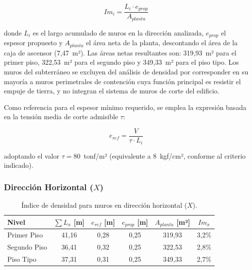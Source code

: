 \begin{equation}
    Im_i = \frac{L_i \cdot e_{prop}}{A_{planta}}
    \label{eq:densidad}
\end{equation}

donde $L_i$ es el largo acumulado de muros en la dirección analizada, 
$e_{prop}$ el espesor propuesto y $A_{planta}$ el área neta de la planta, 
descontando el área de la caja de ascensor (7{,}47~m²). Las áreas netas 
resultantes son: 319{,}93~m² para el primer piso, 322{,}53~m² para el 
segundo piso y 349{,}33~m² para el piso tipo. Los muros del subterráneo 
se excluyen del análisis de densidad por corresponder en su mayoría a 
muros perimetrales de contención cuya función principal es resistir el 
empuje de tierra, y no integran el sistema de muros de corte del edificio.

Como referencia para el espesor mínimo requerido, se emplea la expresión 
basada en la tensión media de corte admisible $\tau$:

\begin{equation}
    e_{ref} = \frac{V}{\tau \cdot L_i}
    \label{eq:eref}
\end{equation}

adoptando el valor $\tau = 80$~tonf/m² (equivalente a 8~kgf/cm², 
conforme al criterio indicado).

\subsubsection{Dirección Horizontal ($X$)}

\begin{table}[H]
    \centering
    \begin{tabular}{lccccc}
        \toprule
        \textbf{Nivel} & 
        $\sum L_x$ \textbf{[m]} & 
        $e_{ref}$ \textbf{[m]} & 
        $e_{prop}$ \textbf{[m]} & 
        $A_{planta}$ \textbf{[m²]} & 
        $Im_x$ \\
        \midrule
        Primer Piso  & 41{,}16 & 0{,}28 & 0{,}25 & 319{,}93 & 3{,}2\% \\
        Segundo Piso & 36{,}41 & 0{,}32 & 0{,}25 & 322{,}53 & 2{,}8\% \\
        Piso Tipo    & 37{,}31 & 0{,}31 & 0{,}25 & 349{,}33 & 2{,}7\% \\
        \bottomrule
    \end{tabular}
    \caption{Índice de densidad para muros en dirección horizontal ($X$).}
    \label{tab:densidad_horiz}
\end{table}

